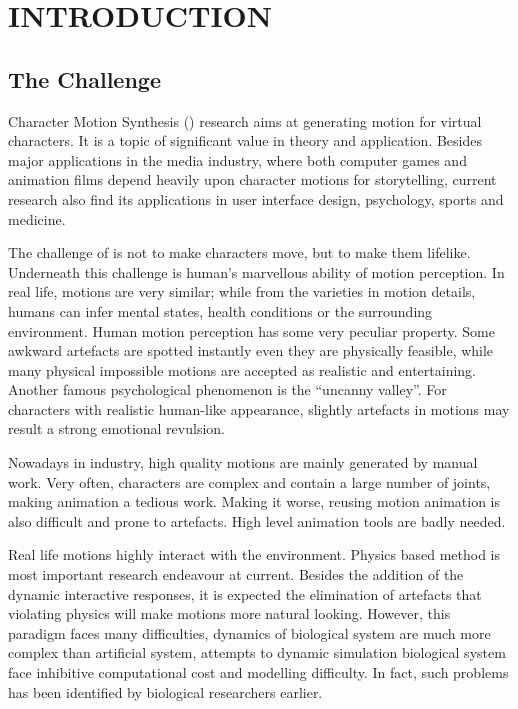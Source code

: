 \chapter{INTRODUCTION}
\label{chap:intro}

\graphicspath{{Introduction/IntroductionFigs/EPS/}{Introduction/IntroductionFigs/}}

\section{The Challenge}
Character Motion Synthesis (\cms) research aims at generating motion for virtual characters.
It is a topic of significant value in theory and application. 
Besides major applications in the media industry, where both computer games and animation films depend heavily upon character motions for storytelling, 
current research also find its applications in user interface design, psychology, sports and medicine.

The challenge of \cms  is not to make characters move, but  to make them lifelike. 
Underneath this challenge is human's marvellous ability of motion perception. 
In real life, motions are very similar; 
while from the varieties in motion details, humans can infer mental states, health conditions or the surrounding environment.
Human motion perception has some very peculiar property.
Some awkward artefacts are spotted instantly even they are physically feasible, while many physical impossible motions are accepted as realistic and entertaining. 
Another famous psychological phenomenon is the ``uncanny valley''.
For characters with realistic human-like appearance, slightly artefacts in motions may result a strong emotional revulsion.



Nowadays in industry, high quality motions are mainly generated by manual work. 
Very often, characters are complex and contain a large number of joints, making animation a tedious work.
Making it worse, reusing motion animation is also difficult and prone to artefacts.
High level animation tools are badly needed. 



Real life motions highly interact with the environment.
Physics based method  is most important research endeavour at current.
Besides  the addition of the dynamic interactive responses, it is  expected  the elimination of  artefacts that violating physics  will make motions more natural looking.
However, this paradigm faces many difficulties, dynamics of biological system are much more complex than artificial system,  attempts to dynamic simulation biological system face inhibitive  computational cost and modelling difficulty.
In fact, such problems has been identified by biological researchers earlier.







